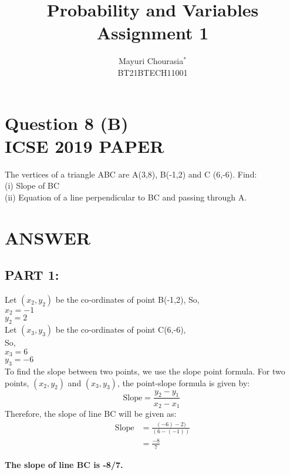 \documentclass[journal,12pt,twocolumn]{IEEEtran}
\begin{document}
     \title{Probability and Variables\\Assignment 1}
     \author{Mayuri Chourasia$^{*}$\\BT21BTECH11001}
     \maketitle
     \section*{\textbf{Question 8 (B)\\ICSE 2019 PAPER}}
     The vertices of a triangle ABC are A(3,8), B(-1,2) and C (6,-6). Find:\\
     (i) Slope of BC\\
     (ii) Equation of a line perpendicular to BC and passing through A.
     \section*{\textbf{ANSWER}}
     \subsection*{PART 1:}
     
     Let $(x_2,y_2)$ be the co-ordinates of point B(-1,2),
     So,\\
     $x_2=-1$\\
     $y_2= 2$\\
     
     Let $(x_3,y_3)$ be the co-ordinates of point C(6,-6),\\
     So,\\
     $x_3= 6$\\
     $y_3= -6$\\
    
     To find the slope between two points, we use the
     slope point formula. For two points, $(x_2,y_2)$ and
     $(x_3,y_3)$, the point-slope formula is given by:\\
     \[\text{Slope} = \frac{y_2-y_1}{x_2-x_1}\ \]
     Therefore, the slope of line BC will be given as:\\
     \begin{align*}
         \text{Slope} &= \frac{(-6)-2)}{(6-(-1))}\\
         &=\frac{-8}{7}
     \end{align*}
     \medskip
     \begin{tcolorbox}
     \begin{center}
         {\textbf{The slope of line BC is -8/7.}}
     \end{center}
     \end{tcolorbox}
\end{document}

